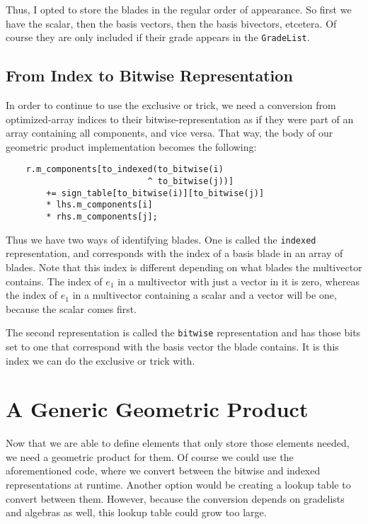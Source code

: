 \documentclass[10pt]{article}
\begin{document}
Thus, I opted to store the blades in the regular order of appearance. So first we have the scalar, then the basis vectors, then the basis bivectors, etcetera. Of course they are only included if their grade appears in the \verb"GradeList".

\subsection{From Index to Bitwise Representation}

In order to continue to use the exclusive or trick, we need a conversion from optimized-array indices to their bitwise-representation as if they were part of an array containing all components, and vice versa. That way, the body of our geometric product implementation becomes the following:
\begin{verbatim}
    r.m_components[to_indexed(to_bitwise(i)
                            ^ to_bitwise(j))]
        += sign_table[to_bitwise(i)][to_bitwise(j)]
        * lhs.m_components[i]
        * rhs.m_components[j];
\end{verbatim}

Thus we have two ways of identifying blades. One is called the
\verb"indexed" representation, and corresponds with the index of a
basis blade in an array of blades. Note that this index is
different depending on what blades the multivector contains. The
index of $e_1$ in a multivector with just a vector in it is zero,
whereas the index of $e_1$ in a multivector containing a scalar
and a vector will be one, because the scalar comes first.

The second representation is called the \verb"bitwise"
representation and has those bits set to one that correspond with
the basis vector the blade contains. It is this index we can do
the exclusive or trick with.

\section{A Generic Geometric Product}

Now that we are able to define elements that only store those
elements needed, we need a geometric product for them. Of course
we could use the aforementioned code, where we convert between the
bitwise and indexed representations at runtime. Another option
would be creating a lookup table to convert between them. However,
because the conversion depends on gradelists and algebras as well,
this lookup table could grow too large.
\end{document}
